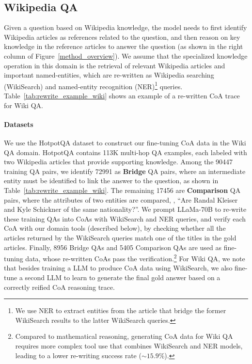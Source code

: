 \subsection{Wikipedia QA}
\label{ss:wikiqa}
Given a question based on Wikipedia knowledge, the model needs to first identify Wikipedia articles as references related to the question, and then reason on key knowledge in the reference articles to answer the question (as shown in the right column of Figure~\ref{method_overview}).
We assume that the specialized knowledge operation in this domain is the retrieval of relevant Wikipedia articles and important named-entities, which are re-written as Wikipedia searching (WikiSearch) and named-entity recognition (NER)\footnote{We use NER to extract entities from the article that bridge the former WikiSearch results to the latter WikiSearch queries.} queries.
Table~\ref{tab:rewrite_example_wiki} shows an example of a re-written CoA trace for Wiki QA.

\paragraph{Datasets}
We use the HotpotQA \citep{yang2018hotpotqa} dataset to construct our fine-tuning CoA data in the Wiki QA domain.
HotpotQA contains 113K multi-hop QA examples, each labeled with two Wikipedia articles that provide supporting knowledge.
Among the 90447 training QA pairs, we identify 72991 as \textbf{Bridge} QA pairs, where an intermediate entity must be identified to link the answer to the question, as shown in Table~\ref{tab:rewrite_example_wiki}.
The remaining 17456 are \textbf{Comparison} QA pairs, where the attributes of two entities are compared, \eg{}, ``Are Randal Kleiser and Kyle Schickner of the same nationality?''.
We prompt LLaMa-70B to re-write these training QAs into CoAs with WikiSearch and NER queries, and verify each CoA with our domain tools (described below), by checking whether all the articles returned by the WikiSearch queries match one of the titles in the gold articles.
Finally, 8956 Bridge QAs and 5405 Comparison QAs are used as fine-tuning data, whose re-written CoAs pass the verification.\footnote{Compared to mathematical reasoning, generating CoA data for Wiki QA requires more complex tool use that combines WikiSearch and NER models, leading to a lower re-writing success rate ($\sim15.9\%$).}
For Wiki QA, we note that besides training a LLM to produce CoA data using WikiSearch, we also fine-tune a second LLM to learn to generate the final gold answer based on a correctly reified CoA reasoning trace.

